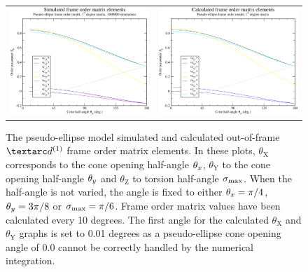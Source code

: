 \begin{figure}
\begin{tabular}{@{}cc@{}}
    \\[-5pt]
    \includegraphics[width=.5\textwidth]{images/frame_order_matrix/Sij_pseudo-ellipse_out_of_frame_theta_z_ens1000000.eps} &
    \includegraphics[width=.5\textwidth]{images/frame_order_matrix/Sij_pseudo-ellipse_out_of_frame_theta_z_calc.eps} \\
  \end{tabular}
  \caption[Pseudo-ellipse simulated and calculated out-of-frame Daeg$^{(1)}$ elements.]{
    The pseudo-ellipse model simulated and calculated out-of-frame $\FOone$ frame order matrix elements.
    In these plots, $\theta_\textrm{X}$ corresponds to the cone opening half-angle $\theta_x$, $\theta_\textrm{Y}$ to the cone opening half-angle $\theta_y$ and $\theta_\textrm{Z}$ to torsion half-angle $\sigma_\textrm{max}$.
    When the half-angle is not varied, the angle is fixed to either $\theta_x = \pi/4$, $\theta_y = 3\pi/8$ or $\sigma_\textrm{max} = \pi/6$.
    Frame order matrix values have been calculated every 10 degrees.
    The first angle for the calculated $\theta_\textrm{X}$ and $\theta_\textrm{Y}$ graphs is set to 0.01 degrees as a pseudo-ellipse cone opening angle of 0.0 cannot be correctly handled by the numerical integration.
  }
  \label{fig: simulated and calculated out-of-frame 1st degree pseudo-ellipse frame order}
\end{figure}

